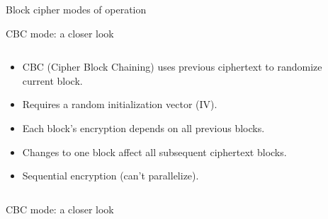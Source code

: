 \documentclass[aspectratio=169, lualatex, handout]{beamer}
\begin{document}
\begin{frame}{Block cipher modes of operation}
\end{frame}

\begin{frame}{CBC mode: a closer look}
	\begin{columns}[c]
		\begin{column}{0.6\textwidth}
			\begin{itemize}[<+->]
				\item CBC (Cipher Block Chaining) uses previous ciphertext to randomize current block.
				\item Requires a random initialization vector (IV).
				\item Each block's encryption depends on all previous blocks.
				\item Changes to one block affect all subsequent ciphertext blocks.
				\item Sequential encryption (can't parallelize).
			\end{itemize}
		\end{column}
		\begin{column}{0.4\textwidth}
		\end{column}
	\end{columns}
\end{frame}

\begin{frame}{CBC mode: a closer look}
	\vspace{-0.3cm}
\end{frame}
\end{document}
